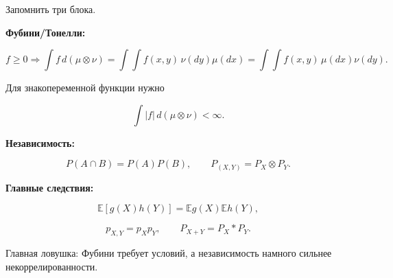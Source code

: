 \documentclass[
  11pt,
  a4paper,
]{article}
\begin{document}
Запомнить три блока.

\textbf{Фубини/Тонелли:}

\[
f\ge0
\Rightarrow
\int f\,d(\mu\otimes\nu)
=
\int\int f(x,y)\,\nu(dy)\mu(dx)
=
\int\int f(x,y)\,\mu(dx)\nu(dy).
\]

Для знакопеременной функции нужно

\[
\int |f|\,d(\mu\otimes\nu)<\infty.
\]

\textbf{Независимость:}

\[
P(A\cap B)=P(A)P(B),
\qquad
P_{(X,Y)}=P_X\otimes P_Y.
\]

\textbf{Главные следствия:}

\[
\mathbb E[g(X)h(Y)]
=
\mathbb E g(X)\mathbb E h(Y),
\]

\[
p_{X,Y}=p_Xp_Y,
\qquad
P_{X+Y}=P_X*P_Y.
\]

Главная ловушка: Фубини требует условий, а независимость намного сильнее
некоррелированности.

\newpage
\end{document}
